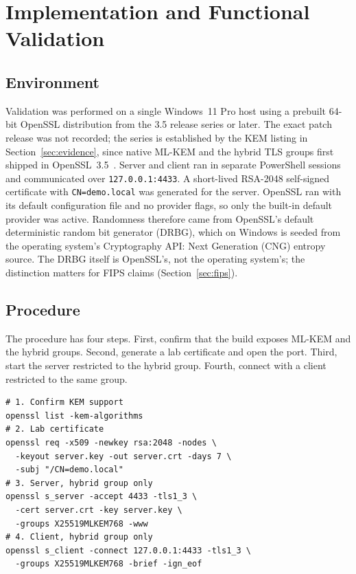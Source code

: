\documentclass[conference]{IEEEtran}
\begin{document}
\section{Implementation and Functional Validation}
\label{sec:validation}

\subsection{Environment}
Validation was performed on a single Windows~11 Pro host using a prebuilt 64-bit OpenSSL distribution from the 3.5 release series or later. The exact patch release was not recorded; the series is established by the KEM listing in Section~\ref{sec:evidence}, since native ML-KEM and the hybrid TLS groups first shipped in OpenSSL~3.5~\cite{openssl35}. Server and client ran in separate PowerShell sessions and communicated over \texttt{127.0.0.1:4433}. A short-lived RSA-2048 self-signed certificate with \texttt{CN=demo.local} was generated for the server. OpenSSL ran with its default configuration file and no provider flags, so only the built-in default provider was active. Randomness therefore came from OpenSSL's default deterministic random bit generator (DRBG), which on Windows is seeded from the operating system's Cryptography API: Next Generation (CNG) entropy source. The DRBG itself is OpenSSL's, not the operating system's; the distinction matters for FIPS claims (Section~\ref{sec:fips}).

\subsection{Procedure}
The procedure has four steps. First, confirm that the build exposes ML-KEM and the hybrid groups. Second, generate a lab certificate and open the port. Third, start the server restricted to the hybrid group. Fourth, connect with a client restricted to the same group.

\begin{lstlisting}
# 1. Confirm KEM support
openssl list -kem-algorithms
# 2. Lab certificate
openssl req -x509 -newkey rsa:2048 -nodes \
  -keyout server.key -out server.crt -days 7 \
  -subj "/CN=demo.local"
# 3. Server, hybrid group only
openssl s_server -accept 4433 -tls1_3 \
  -cert server.crt -key server.key \
  -groups X25519MLKEM768 -www
# 4. Client, hybrid group only
openssl s_client -connect 127.0.0.1:4433 -tls1_3 \
  -groups X25519MLKEM768 -brief -ign_eof
\end{lstlisting}
\end{document}

